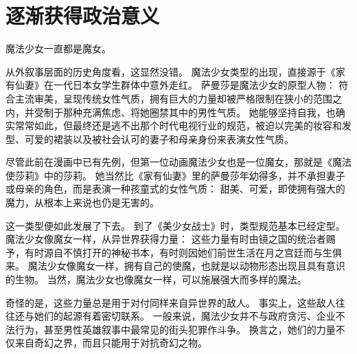\chapter[逐渐获得政治意义]{逐渐获得政治意义}



魔法少女一直都是魔女。

从外叙事层面的历史角度看，这显然没错。
魔法少女类型的出现，直接源于《家有仙妻》在一代日本女学生群体中意外走红\cite{orbaugh2003busty-battlin-babes}。
萨曼莎是魔法少女的原型人物：
符合主流审美，呈现传统女性气质，拥有巨大的力量却被严格限制在狭小的范围之内，并受制于那种充满焦虑、将她圈禁其中的男性气质。
她能够坚持自我，也确实常常如此，但最终还是逃不出那个时代电视行业的规范，被迫以完美的妆容和发型、可爱的裙装以及被社会认可的妻子和母亲身份来表演女性气质\cite{bewitched2013}。

尽管此前在漫画中已有先例，但第一位动画魔法少女也是一位魔女，那就是《魔法使莎莉》中的莎莉。
她当然比《家有仙妻》里的萨曼莎年幼得多，并不承担妻子或母亲的角色，而是表演一种孩童式的女性气质：
甜美、可爱，即使拥有强大的魔力，从根本上来说也仍是无害的\cite{sally-witch1966}。

这一类型便如此发展了下去。
到了《美少女战士》时，类型规范基本已经定型。
魔法少女像魔女一样，从异世界获得力量：
这些力量有时由镜之国的统治者赐予，有时源自不慎打开的神秘书本，有时则因她们前世生活在月之宫廷而与生俱来。
魔法少女像魔女一样，拥有自己的使魔，也就是以动物形态出现且具有意识的生物。
当然，魔法少女也像魔女一样，可以施展强大而多样的魔法。

奇怪的是，这些力量总是用于对付同样来自异世界的敌人。
事实上，这些敌人往往还与她们的起源有着密切联系。
一般来说，魔法少女并不与政府贪污、企业不法行为，甚至男性英雄叙事中最常见的街头犯罪作斗争。
换言之，她们的力量不仅来自奇幻之界，而且只能用于对抗奇幻之物。

